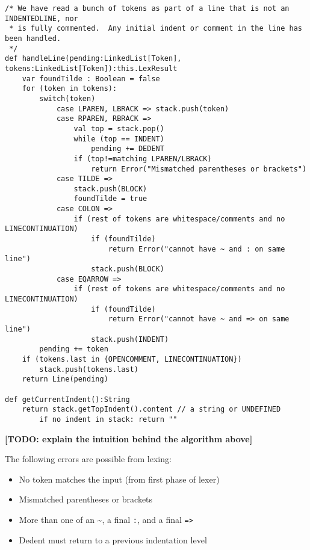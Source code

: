 \documentclass[11pt]{article}
\newcommand{\TODO}[1]{\textbf{[TODO: #1]}}
\begin{document}
\begin{sloppypar}
\begin{lstlisting}
/* We have read a bunch of tokens as part of a line that is not an INDENTEDLINE, nor
 * is fully commented.  Any initial indent or comment in the line has been handled.
 */
def handleLine(pending:LinkedList[Token], tokens:LinkedList[Token]):this.LexResult
    var foundTilde : Boolean = false
    for (token in tokens):
        switch(token)
            case LPAREN, LBRACK => stack.push(token)
            case RPAREN, RBRACK =>
                val top = stack.pop()
                while (top == INDENT)
                    pending += DEDENT
                if (top!=matching LPAREN/LBRACK)
                    return Error("Mismatched parentheses or brackets")
            case TILDE =>
                stack.push(BLOCK)
                foundTilde = true
            case COLON =>
                if (rest of tokens are whitespace/comments and no LINECONTINUATION)
                    if (foundTilde)
                        return Error("cannot have ~ and : on same line")
                    stack.push(BLOCK)
            case EQARROW =>
                if (rest of tokens are whitespace/comments and no LINECONTINUATION)
                    if (foundTilde)
                        return Error("cannot have ~ and => on same line")
                    stack.push(INDENT)
        pending += token
    if (tokens.last in {OPENCOMMENT, LINECONTINUATION})
        stack.push(tokens.last)
    return Line(pending)

def getCurrentIndent():String
    return stack.getTopIndent().content // a string or UNDEFINED
        if no indent in stack: return ""

\end{lstlisting}

\TODO{explain the intuition behind the algorithm above}

The following errors are possible from lexing:

\begin{itemize}

\item No token matches the input (from first phase of lexer)
\item Mismatched parentheses or brackets
\item More than one of an \textasciitilde{}, a final \texttt{:}, and a final \verb|=>|
\item Dedent must return to a previous indentation level

\end{itemize}


\end{sloppypar}
\end{document}
